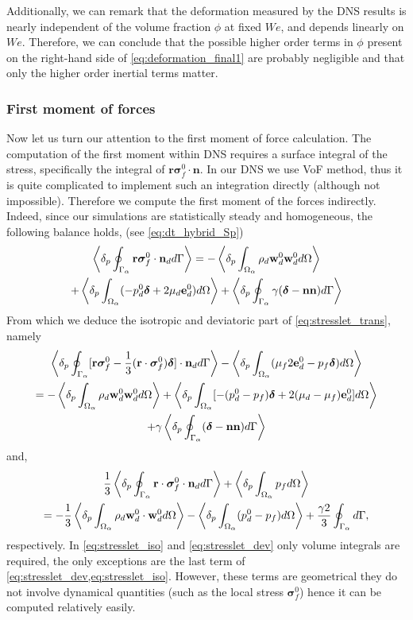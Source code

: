 Additionally, we can remark that the deformation measured by the DNS results is nearly independent of the volume fraction $\phi$ at fixed $We$, and depends linearly on $We$. 
Therefore, we can conclude that the possible higher order terms in $\phi$ present on the right-hand side of \ref{eq:deformation_final1} are probably negligible and that only the higher order inertial terms matter. 


\subsubsection{First moment of forces}

Now let us turn our attention to the first moment of force calculation. 
The computation of the first moment within DNS requires a surface integral of the stress, specifically the integral of $\textbf{r}\bm\sigma_f^0\cdot\textbf{n}$. 
In our DNS we use VoF method, thus it is quite complicated to implement such an integration directly (although not impossible).
Therefore we compute the first moment of the forces indirectly. 
Indeed, since our simulations are statistically steady and homogeneous, the following balance holds, (see \ref{eq:dt_hybrid_Sp})
\begin{multline}
    \left<\delta_p \oint_{\Gamma_{\alpha}} \textbf{r}\bm\sigma_f^0\cdot \textbf{n}_d d\Gamma\right>
    = 
    - \left<\delta_p \int_{\Omega_{\alpha}} \rho_d \textbf{w}_d^0  \textbf{w}_d^0  d\Omega\right>\\
    + \left<\delta_p \int_{\Omega_{\alpha}} (-p_d^0 \bm\delta + 2\mu_d \textbf{e}_d^0) d\Omega\right>
    +  \left<\delta_p \oint_{\Gamma_{\alpha}} \gamma (\bm\delta - \textbf{nn}) d\Gamma\right>
\end{multline}
From which we deduce the isotropic and deviatoric part of \ref{eq:stresslet_trans}, namely 
\begin{multline}
    \pSavg{[\textbf{r}\bm\sigma_f^0 - \frac{1}{3}(\textbf{r}\cdot \bm\sigma_f^0)\bm\delta]\cdot \textbf{n}_d}
    - \pOavg{(\mu_f 2 \textbf{e}_d^0  -  p_f\bm\delta)}\\
    = 
    - \pOavg{\rho_d \textbf{w}_d^0  \textbf{w}_d^0 }
    + \pOavg{[-(p_d^0-p_f) \bm\delta + 2(\mu_d-\mu_f) \textbf{e}_d^0]}\\
    + \gamma \pSavg{ (\bm\delta - \textbf{nn})}
    \label{eq:stresslet_dev}
\end{multline}
and, 
\begin{multline}
    \frac{1}{3}\pSavg{\textbf{r}\cdot\bm\sigma_f^0\cdot \textbf{n}_d}
    + \pOavg{p_f}\\
    = 
    -\frac{1}{3} \pOavg{\rho_d \textbf{w}_d^0 \cdot  \textbf{w}_d^0 }
    - \pOavg{(p_d^0-p_f) }
    + \frac{\gamma 2}{3} \intS{},
    \label{eq:stresslet_iso}
\end{multline}
respectively. 
In \ref{eq:stresslet_iso} and \ref{eq:stresslet_dev} only volume integrals are required, the only exceptions are the last term of \ref{eq:stresslet_dev,eq:stresslet_iso}.
However, these terms are geometrical they do not involve dynamical quantities (such as the local stress $\bm\sigma_f^0$) hence it can be computed relatively easily. 

